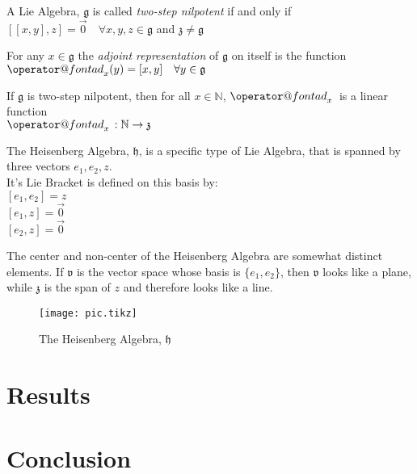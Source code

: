 \documentclass[11 pt]{article}
\makeatletter
\newcommand{\fg}{\mathfrak{g}}
\newcommand{\fz}{\mathfrak{z}}
\newcommand{\fv}{\mathfrak{v}}
\newcommand{\fh}{\mathfrak{h}}
\newcommand{\NN}{\mathbb{N}}
\newcommand{\ad}[1]{\mathop{\operator@font ad}\nolimits_{#1}}
\makeatother
\begin{document}
\begin{definition}
    A Lie Algebra, $\fg$ is called \emph{two-step nilpotent} if and only if
    \\$[[x,y],z] = \Vec{0} \quad \forall x,y,z \in \fg$
    and $\fz \neq \fg$
\end{definition}

\begin{definition}
    For any $x \in \fg$ the \emph{adjoint representation} of $\fg$ on itself is
    the function
    \\$\ad{x}(y) = [x,y] \quad \forall y \in \fg$
\end{definition}

If $\fg$ is two-step nilpotent, then for all $x \in \NN$, $\ad{x}{}$ is a
linear function
\\$\ad{x}{}: \NN \to \fz$

\begin{example}
    The Heisenberg Algebra, $\fh$,  is a specific type of Lie Algebra, that is
    spanned by three vectors $e_1, e_2, z$.
    \\It's Lie Bracket is defined on this basis by:
    \\$[e_1, e_2] = z$
    \\$[e_1, z] = \Vec{0}$
    \\$[e_2, z] = \Vec{0}$
\end{example}
The center and non-center of the Heisenberg Algebra are somewhat distinct
elements.
If $\fv$ is the vector space whose basis is $\{e_1, e_2\}$, then
$\fv$ looks like a plane, while $\fz$ is the span of $z$ and therefore looks
like a line.

\begin{figure}[h]
    \centering
    \texttt{[image: pic.tikz]} %
        \label{fig:pic} %
    \caption{\footnotesize The Heisenberg Algebra, $\fh$} %
\end{figure}

\pagebreak



\section{Results}

\section{Conclusion}
\end{document}

